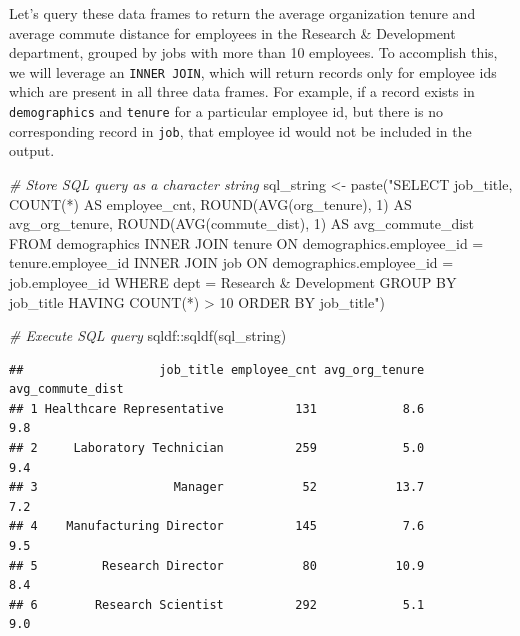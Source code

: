\documentclass[
]{book}
\newenvironment{Shaded}{\begin{snugshade}}{\end{snugshade}}
\newcommand{\CommentTok}[1]{\textcolor[rgb]{0.56,0.35,0.01}{\textit{#1}}}
\newcommand{\FunctionTok}[1]{\textcolor[rgb]{0.00,0.00,0.00}{#1}}
\newcommand{\NormalTok}[1]{#1}
\newcommand{\OtherTok}[1]{\textcolor[rgb]{0.56,0.35,0.01}{#1}}
\newcommand{\SpecialCharTok}[1]{\textcolor[rgb]{0.00,0.00,0.00}{#1}}
\newcommand{\StringTok}[1]{\textcolor[rgb]{0.31,0.60,0.02}{#1}}
\begin{document}
Let's query these data frames to return the average organization tenure and average commute distance for employees in the Research \& Development department, grouped by jobs with more than 10 employees. To accomplish this, we will leverage an \texttt{INNER\ JOIN}, which will return records only for employee ids which are present in all three data frames. For example, if a record exists in \texttt{demographics} and \texttt{tenure} for a particular employee id, but there is no corresponding record in \texttt{job}, that employee id would not be included in the output.

\begin{Shaded}
\begin{Highlighting}[]
\CommentTok{\# Store SQL query as a character string}
\NormalTok{sql\_string }\OtherTok{\textless{}{-}} \FunctionTok{paste}\NormalTok{(}\StringTok{"SELECT}
\StringTok{                      job\_title,}
\StringTok{                      COUNT(*) AS employee\_cnt,}
\StringTok{                      ROUND(AVG(org\_tenure), 1) AS avg\_org\_tenure,}
\StringTok{                      ROUND(AVG(commute\_dist), 1) AS avg\_commute\_dist}
\StringTok{                    FROM}
\StringTok{                        demographics}
\StringTok{                      INNER JOIN}
\StringTok{                        tenure}
\StringTok{                      ON}
\StringTok{                        demographics.employee\_id = tenure.employee\_id}
\StringTok{                      INNER JOIN}
\StringTok{                        job}
\StringTok{                      ON}
\StringTok{                        demographics.employee\_id = job.employee\_id}
\StringTok{                    WHERE}
\StringTok{                      dept = \textquotesingle{}Research \& Development\textquotesingle{}}
\StringTok{                    GROUP BY}
\StringTok{                      job\_title}
\StringTok{                    HAVING}
\StringTok{                      COUNT(*) \textgreater{} 10}
\StringTok{                    ORDER BY}
\StringTok{                      job\_title"}\NormalTok{)}

\CommentTok{\# Execute SQL query}
\NormalTok{sqldf}\SpecialCharTok{::}\FunctionTok{sqldf}\NormalTok{(sql\_string)}
\end{Highlighting}
\end{Shaded}

\begin{verbatim}
##                   job_title employee_cnt avg_org_tenure avg_commute_dist
## 1 Healthcare Representative          131            8.6              9.8
## 2     Laboratory Technician          259            5.0              9.4
## 3                   Manager           52           13.7              7.2
## 4    Manufacturing Director          145            7.6              9.5
## 5         Research Director           80           10.9              8.4
## 6        Research Scientist          292            5.1              9.0
\end{verbatim}
\end{document}
